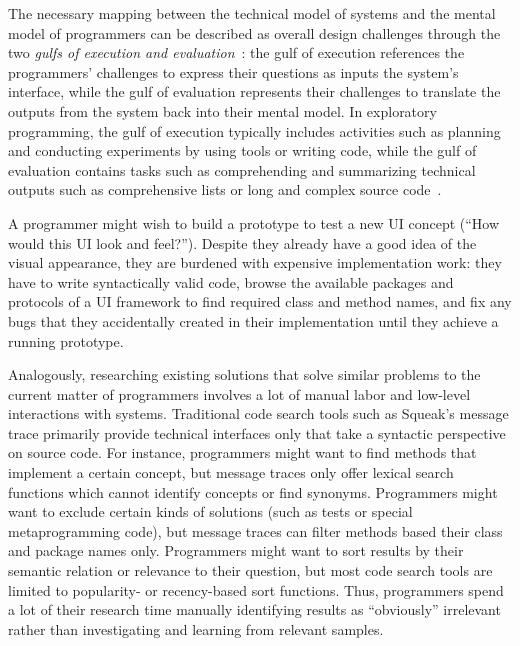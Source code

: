 The necessary mapping between the technical model of systems and the mental model of programmers can be described as overall design challenges through the two \emph{gulfs of execution and evaluation}~\cite{norman1986cognitive}:
the gulf of execution references the programmers' challenges to express their questions as inputs the system's interface, while the gulf of evaluation represents their challenges to translate the outputs from the system back into their mental model.
In exploratory programming, the gulf of execution typically includes activities such as planning and conducting experiments by using tools or writing code, while the gulf of evaluation contains tasks such as comprehending and summarizing technical outputs such as comprehensive lists or long and complex source code~\cite{rein2020empirical}.

\begin{example}[5]
	\label{ex:background/challenges}
	A programmer might wish to build a prototype to test a new UI concept (``How would this UI look and feel?'').
	Despite they already have a good idea of the visual appearance, they are burdened with expensive implementation work:
	they have to write syntactically valid code, browse the available packages and protocols of a UI framework to find required class and method names, and fix any bugs that they accidentally created in their implementation until they achieve a running prototype.

	Analogously, researching existing solutions that solve similar problems to the current matter of programmers involves a lot of manual labor and low-level interactions with systems.
	Traditional code search tools such as Squeak's message trace primarily provide technical interfaces only that take a syntactic perspective on source code.
	For instance, programmers might want to find methods that implement a certain concept, but message traces only offer lexical search functions which cannot identify concepts or find synonyms.
	Programmers might want to exclude certain kinds of solutions (such as tests or special metaprogramming code), but message traces can filter methods based their class and package names only.
	Programmers might want to sort results by their semantic relation or relevance to their question, but most code search tools are limited to popularity- or recency-based sort functions.
	Thus, programmers spend a lot of their research time manually identifying results as ``obviously'' irrelevant rather than investigating and learning from relevant samples.
\end{example}

